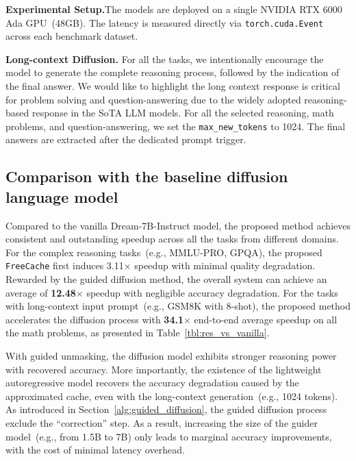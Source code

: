 

\textbf{Experimental Setup.}The models are deployed on a single NVIDIA RTX 6000 Ada GPU~(48GB). The latency is measured directly via \texttt{torch.cuda.Event} across each benchmark dataset. 

\textbf{Long-context Diffusion.}
For all the tasks, we intentionally encourage the model to generate the complete reasoning process, followed by the indication of the final answer. 
We would like to highlight the long context response is critical for problem solving and question-answering due to the widely adopted reasoning-based response in the SoTA LLM models. 
For all the selected reasoning, math problems, and question-answering, we set the \texttt{max\_new\_tokens} to 1024. The final answers are extracted after the dedicated prompt trigger. 

\subsection{Comparison with the baseline diffusion language model}
Compared to the vanilla Dream-7B-Instruct model, the proposed method achieves consistent and outstanding speedup across all the tasks from different domains. 
For the complex reasoning tasks~(e.g., MMLU-PRO, GPQA), the proposed \texttt{FreeCache} first induces 3.11$\times$ speedup with minimal quality degradation. Rewarded by the guided diffusion method, the overall system can achieve an average of \textbf{12.48}$\times$ speedup with negligible accuracy degradation.
For the tasks with long-context input prompt~(e.g., GSM8K with 8-shot), the proposed method accelerates the diffusion process with \textbf{34.1}$\times$ end-to-end average speedup on all the math problems, as presented in Table~\ref{tbl:res_vs_vanilla}. 

With guided unmasking, the diffusion model exhibits stronger reasoning power with recovered accuracy. More importantly, the existence of the lightweight autoregressive model recovers the accuracy degradation caused by the approximated cache, even with the long-context generation~(e.g., 1024 tokens). 
As introduced in Section~\ref{alg:guided_diffusion}, the guided diffusion process exclude the ``correction'' step. As a result, increasing the size of the guider model~(e.g., from 1.5B to 7B) only leads to marginal accuracy improvements, with the cost of minimal latency overhead. 

